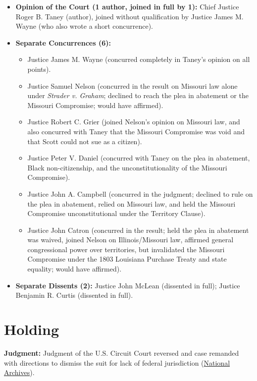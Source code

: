 \documentclass[12pt]{article}
\begin{document}
\begin{itemize}
  \item \textbf{Opinion of the Court (1 author, joined in full by 1):} Chief Justice Roger B. Taney (author), joined without qualification by Justice James M. Wayne (who also wrote a short concurrence).
  \item \textbf{Separate Concurrences (6):}
    \begin{itemize}
      \item Justice James M. Wayne (concurred completely in Taney's opinion on all points).
      \item Justice Samuel Nelson (concurred in the result on Missouri law alone under \textit{Strader v. Graham}; declined to reach the plea in abatement or the Missouri Compromise; would have affirmed).
      \item Justice Robert C. Grier (joined Nelson's opinion on Missouri law, and also concurred with Taney that the Missouri Compromise was void and that Scott could not sue as a citizen).
      \item Justice Peter V. Daniel (concurred with Taney on the plea in abatement, Black non-citizenship, and the unconstitutionality of the Missouri Compromise).
      \item Justice John A. Campbell (concurred in the judgment; declined to rule on the plea in abatement, relied on Missouri law, and held the Missouri Compromise unconstitutional under the Territory Clause).
      \item Justice John Catron (concurred in the result; held the plea in abatement was waived, joined Nelson on Illinois/Missouri law, affirmed general congressional power over territories, but invalidated the Missouri Compromise under the 1803 Louisiana Purchase Treaty and state equality; would have affirmed).
    \end{itemize}
  \item \textbf{Separate Dissents (2):} Justice John McLean (dissented in full); Justice Benjamin R. Curtis (dissented in full).
\end{itemize}

\section{Holding}

\textbf{Judgment:} Judgment of the U.S. Circuit Court reversed and case remanded with directions to dismiss the suit for lack of federal jurisdiction (\href{https://www.archives.gov/milestone-documents/dred-scott-v-sandford}{National Archives}).
\end{document}
